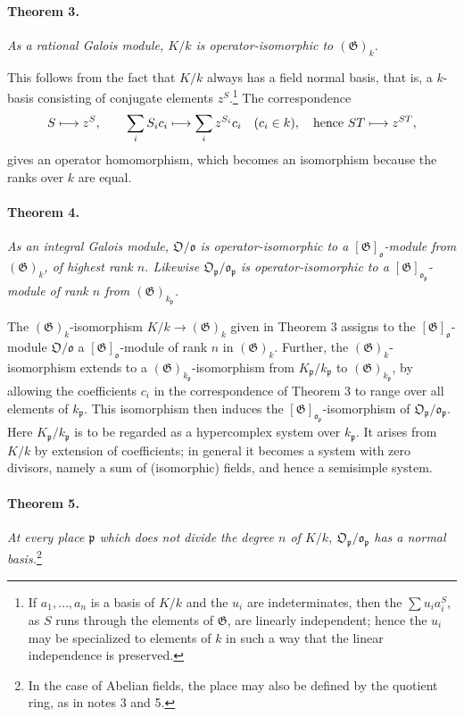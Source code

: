 \documentclass[11pt]{article}
\providecommand{\frakO}{\mathfrak O}
\providecommand{\frako}{\mathfrak o}
\providecommand{\frakp}{\mathfrak p}
\providecommand{\Gg}{\mathfrak G}
\begin{document}
\paragraph{Theorem 3.}
\emph{As a rational Galois module, \(K/k\) is operator-isomorphic to \((\Gg)_k\).}

This follows from the fact that \(K/k\) always has a field normal basis, that is, a \(k\)-basis consisting of conjugate elements \(z^S\).\footnote{If \(a_1,\ldots,a_n\) is a basis of \(K/k\) and the \(u_i\) are indeterminates, then the \(\sum u_i a_i^S\), as \(S\) runs through the elements of \(\Gg\), are linearly independent; hence the \(u_i\) may be specialized to elements of \(k\) in such a way that the linear independence is preserved.} The correspondence
\[
        S\longmapsto z^S,
        \qquad
        \sum_i S_i c_i\longmapsto \sum_i z^{S_i}c_i
        \quad(c_i\in k),
        \quad\hbox{hence } ST\longmapsto z^{ST},
\]
gives an operator homomorphism, which becomes an isomorphism because the ranks over \(k\) are equal.

\paragraph{Theorem 4.}
\emph{As an integral Galois module, \(\frakO/\frako\) is operator-isomorphic to a \([\Gg]_\frako\)-module from \((\Gg)_k\), of highest rank \(n\). Likewise \(\frakO_\frakp/\frako_\frakp\) is operator-isomorphic to a \([\Gg]_{\frako_\frakp}\)-module of rank \(n\) from \((\Gg)_{k_\frakp}\).}

The \((\Gg)_k\)-isomorphism \(K/k\to(\Gg)_k\) given in Theorem 3 assigns to the \([\Gg]_\frako\)-module \(\frakO/\frako\) a \([\Gg]_\frako\)-module of rank \(n\) in \((\Gg)_k\). Further, the \((\Gg)_k\)-isomorphism extends to a \((\Gg)_{k_\frakp}\)-isomorphism from \(K_\frakp/k_\frakp\) to \((\Gg)_{k_\frakp}\), by allowing the coefficients \(c_i\) in the correspondence of Theorem 3 to range over all elements of \(k_\frakp\). This isomorphism then induces the \([\Gg]_{\frako_\frakp}\)-isomorphism of \(\frakO_\frakp/\frako_\frakp\). Here \(K_\frakp/k_\frakp\) is to be regarded as a hypercomplex system over \(k_\frakp\). It arises from \(K/k\) by extension of coefficients; in general it becomes a system with zero divisors, namely a sum of (isomorphic) fields, and hence a semisimple system.

\paragraph{Theorem 5.}
\emph{At every place \(\frakp\) which does not divide the degree \(n\) of \(K/k\), \(\frakO_\frakp/\frako_\frakp\) has a normal basis.}\footnote{In the case of Abelian fields, the place may also be defined by the quotient ring, as in notes 3 and 5.}
\end{document}
